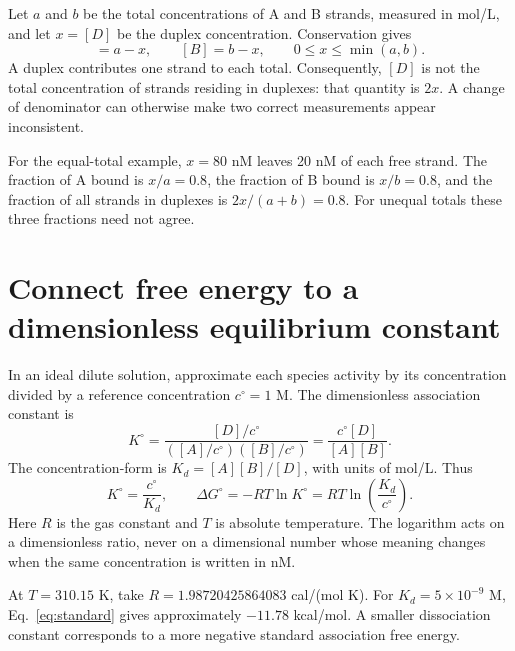 
Let $a$ and $b$ be the total concentrations of A and B strands, measured
in mol/L, and let $x=[D]$ be the duplex concentration. Conservation gives
\begin{equation}
[A]=a-x,\qquad [B]=b-x,\qquad 0\leq x\leq\min(a,b).
\label{eq:conservation}
\end{equation}
A duplex contributes one strand to each total. Consequently, $[D]$ is not
the total concentration of strands residing in duplexes: that quantity is
$2x$. A change of denominator can otherwise make two correct measurements
appear inconsistent.

For the equal-total example, $x=80$ nM leaves 20 nM of each free strand.
The fraction of A bound is $x/a=0.8$, the fraction of B bound is $x/b=0.8$,
and the fraction of all strands in duplexes is $2x/(a+b)=0.8$.
For unequal totals these three fractions need not agree.

\section{Connect free energy to a dimensionless equilibrium constant}

In an ideal dilute solution, approximate each species activity by its
concentration divided by a reference concentration $c^\circ=1$ M.
The dimensionless association constant is
\begin{equation}
K^\circ
=\frac{[D]/c^\circ}{([A]/c^\circ)([B]/c^\circ)}
=\frac{c^\circ[D]}{[A][B]}.
\end{equation}
The concentration-form  is
$K_d=[A][B]/[D]$, with units of mol/L. Thus
\begin{equation}
K^\circ=\frac{c^\circ}{K_d},\qquad
\Delta G^\circ=-RT\ln K^\circ
=RT\ln\left(\frac{K_d}{c^\circ}\right).
\label{eq:standard}
\end{equation}
Here $R$ is the gas constant and $T$ is absolute temperature.
The logarithm acts on a dimensionless ratio, never on a dimensional number
whose meaning changes when the same concentration is written in nM.

At $T=310.15$ K, take $R=1.98720425864083$ cal/(mol K).
For $K_d=5\times10^{-9}$ M, Eq.~\ref{eq:standard} gives approximately
$-11.78$ kcal/mol. A smaller dissociation constant corresponds to a more
negative standard association free energy.

